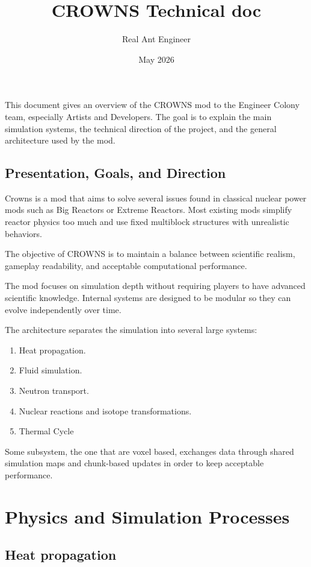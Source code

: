 \documentclass{report}
\title{CROWNS Technical doc}
\author{Real Ant Engineer}
\date{May 2026}
\begin{document}
\maketitle

\newpage
This document gives an overview of the CROWNS mod to the Engineer Colony team, especially Artists and Developers. The goal is to explain the main simulation systems, the technical direction of the project, and the general architecture used by the mod.
\newpage

\tableofcontents

\section{Presentation, Goals, and Direction}

Crowns is a mod that aims to solve several issues found in classical nuclear power mods such as Big Reactors or Extreme Reactors. Most existing mods simplify reactor physics too much and use fixed multiblock structures with unrealistic behaviors.

The objective of CROWNS is to maintain a balance between scientific realism, gameplay readability, and acceptable computational performance.

The mod focuses on simulation depth without requiring players to have advanced scientific knowledge. Internal systems are designed to be modular so they can evolve independently over time.

The architecture separates the simulation into several large systems:
\begin{enumerate}
    \item Heat propagation.
    \item Fluid simulation.
    \item Neutron transport.
    \item Nuclear reactions and isotope transformations.
    \item Thermal Cycle
\end{enumerate}

Some subsystem, the one that are voxel based, exchanges data through shared simulation maps and chunk-based updates in order to keep acceptable performance.

\chapter{Physics and Simulation Processes}

\section{Heat propagation}
\end{document}
